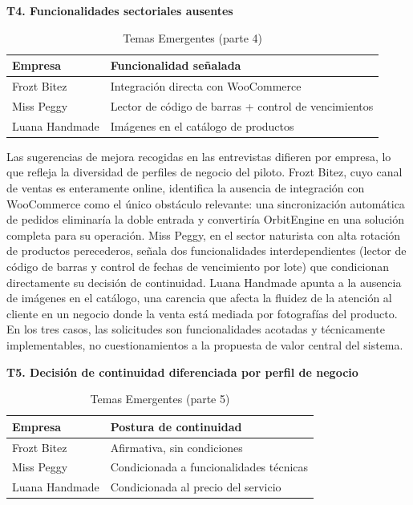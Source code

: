 \textbf{T4. Funcionalidades sectoriales ausentes}

\begin{longtable}[]{@{}
  >{\raggedright\arraybackslash}p{}
  >{\raggedright\arraybackslash}p{}@{}}
\caption[Temas Emergentes (parte 4)]{Temas Emergentes (parte 4)}\tabularnewline
\toprule\noalign{}
\begin{minipage}[b]{\linewidth}\raggedright
Empresa
\end{minipage} & \begin{minipage}[b]{\linewidth}\raggedright
Funcionalidad señalada
\end{minipage} \\
\midrule\noalign{}
\endhead
\bottomrule\noalign{}
\endlastfoot
Frozt Bitez & Integración directa con WooCommerce \\
Miss Peggy & Lector de código de barras + control de vencimientos \\
Luana Handmade & Imágenes en el catálogo de productos \\
\end{longtable}

Las sugerencias de mejora recogidas en las entrevistas difieren por empresa, lo que refleja la diversidad de perfiles de negocio del piloto. Frozt Bitez, cuyo canal de ventas es enteramente online, identifica la ausencia de integración con WooCommerce como el único obstáculo relevante: una sincronización automática de pedidos eliminaría la doble entrada y convertiría OrbitEngine en una solución completa para su operación. Miss Peggy, en el sector naturista con alta rotación de productos perecederos, señala dos funcionalidades interdependientes (lector de código de barras y control de fechas de vencimiento por lote) que condicionan directamente su decisión de continuidad. Luana Handmade apunta a la ausencia de imágenes en el catálogo, una carencia que afecta la fluidez de la atención al cliente en un negocio donde la venta está mediada por fotografías del producto. En los tres casos, las solicitudes son funcionalidades acotadas y técnicamente implementables, no cuestionamientos a la propuesta de valor central del sistema.

\textbf{T5. Decisión de continuidad diferenciada por perfil de negocio}

\begin{longtable}[]{@{}ll@{}}
\caption[Temas Emergentes (parte 5)]{Temas Emergentes (parte 5)}\tabularnewline
\toprule\noalign{}
Empresa & Postura de continuidad \\
\midrule\noalign{}
\endhead
\bottomrule\noalign{}
\endlastfoot
Frozt Bitez & Afirmativa, sin condiciones \\
Miss Peggy & Condicionada a funcionalidades técnicas \\
Luana Handmade & Condicionada al precio del servicio \\
\end{longtable}

